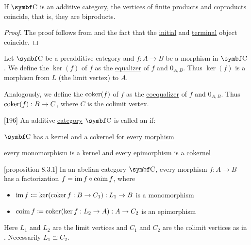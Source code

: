 \begin{theorem}\label{thm:additive_category_biproducts}
  If \( \Cat{C} \) is an additive category, the vertices of finite products and coproducts coincide, that is, they are biproducts.
\end{theorem}
\begin{proof}
  The proof follows from  and the fact that the \hyperref[remark:empty_categorical_coproduct]{initial} and \hyperref[remark:empty_categorical_product]{terminal} object coincide.
\end{proof}

\begin{definition}\label{def:categorical_kernel}
  Let \( \Cat{C} \) be a preadditive category and \( f: A \to B \) be a morphism in \( \Cat{C} \). We define the  \( \ker(f) \) of \( f \) as the \hyperref[def:categorical_equalizer]{equalizer} of \( f \) and \( 0_{A,B} \). Thus \( \ker(f) \) is a morphism from \( L \) (the limit vertex) to \( A \).

  Analogously, we define the  \( \operatorname{co}\!\ker(f) \) of \( f \) as the \hyperref[def:categorical_coequalizer]{coequalizer} of \( f \) and \( 0_{A,B} \). Thus \( \operatorname{co}\!\ker(f): B \to C \), where \( C \) is the colimit vertex.
\end{definition}

\begin{definition}\label{def:abelian_category}\cite{MacLane1994}[196]
  An additive \hyperref[def:additive_category]{category} \( \Cat{C} \) is called an  if:
  \begin{defenum}
    \item \( \Cat{C} \) has a kernel and a cokernel for every \hyperref[def:categorical_kernel]{morphism}
    \item every monomorphism is a kernel and every epimorphism is a \hyperref[def:morphism_invertibility]{cokernel}
  \end{defenum}
\end{definition}

\begin{proposition}\label{def:abelian_category_morphism_factorization}\cite{MacLane1994}[proposition 8.3.1]
  In an abelian category \( \Cat{C} \), every morphism \( f: A \to B \) has a factorization \( f = \operatorname{im} f \circ \operatorname{co}\!\operatorname{im} f \), where
  \begin{itemize}
    \item \( \operatorname{im} f \coloneqq \ker(\operatorname{co}\!\ker f: B \to C_1): L_1 \to B \) is a monomorphism
    \item \( \operatorname{co}\!\operatorname{im} f \coloneqq \operatorname{co}\!\ker(\ker f: L_2 \to A): A \to C_2 \) is an epimorphism
  \end{itemize}
  Here \( L_1 \) and \( L_2 \) are the limit vertices and \( C_1 \) and \( C_2 \) are the colimit vertices as in . Necessarily \( L_1 \cong C_2 \).
\end{proposition}

